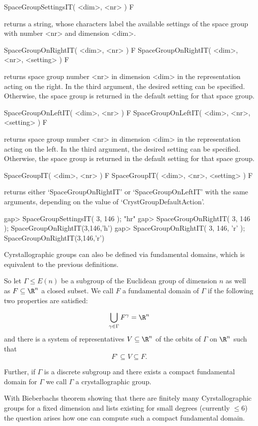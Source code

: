 \>SpaceGroupSettingsIT( <dim>, <nr> ) F

returns a string, whose characters label the available settings of
the space group with number <nr> and dimension <dim>.

\> SpaceGroupOnRightIT( <dim>, <nr> ) F
\> SpaceGroupOnRightIT( <dim>, <nr>, <setting> ) F

returns space group number <nr> in dimension <dim> in the
representation acting on the right. In the third argument,
the desired setting can be specified. Otherwise, the space 
group is returned in the default setting for that space group.

\> SpaceGroupOnLeftIT( <dim>, <nr> ) F
\> SpaceGroupOnLeftIT( <dim>, <nr>, <setting> ) F

returns space group number <nr> in dimension <dim> in the
representation acting on the left. In the third argument,
the desired setting can be specified. Otherwise, the space 
group is returned in the default setting for that space group.

\> SpaceGroupIT( <dim>, <nr> ) F
\> SpaceGroupIT( <dim>, <nr>, <setting> ) F

returns either `SpaceGroupOnRightIT' or `SpaceGroupOnLeftIT' with
the same arguments, depending on the value of `CrystGroupDefaultAction'.

\beginexample
gap> SpaceGroupSettingsIT( 3, 146 );
"hr"
gap> SpaceGroupOnRightIT( 3, 146 );        
SpaceGroupOnRightIT(3,146,'h')
gap> SpaceGroupOnRightIT( 3, 146, 'r' );
SpaceGroupOnRightIT(3,146,'r')
\endexample


Cyrstallographic groups can also be defined via fundamental domains, which is equivalent to the previous definitions. 

So let $\Gamma \leq E(n)$ be a subgroup of the Euclidean group of dimension $n$ as well as $F \subseteq \R^n$ a closed subset. 
We call $F$ a fundamental domain of $\Gamma$ if the following two properties are satisfied:

$$\bigcup_{\gamma \in \Gamma} F^\gamma = \R^n$$
and there is a system of representatives $V \subseteq \R^n$ of the orbits of $\Gamma$ on $\R^n$ such that 
$$F^\circ \subseteq V \subseteq F.$$ 

Further, if $\Gamma$ is a discrete subgroup and there exists a compact fundamental domain for $\Gamma$ we call $\Gamma$ a crystallographic group.

With Bieberbachs theorem showing that there are finitely many Cyrstallographic groups for a fixed dimension and lists existing for small degrees (currently $\leq 6$) the question arises how one can compute such a compact fundamental domain. 

